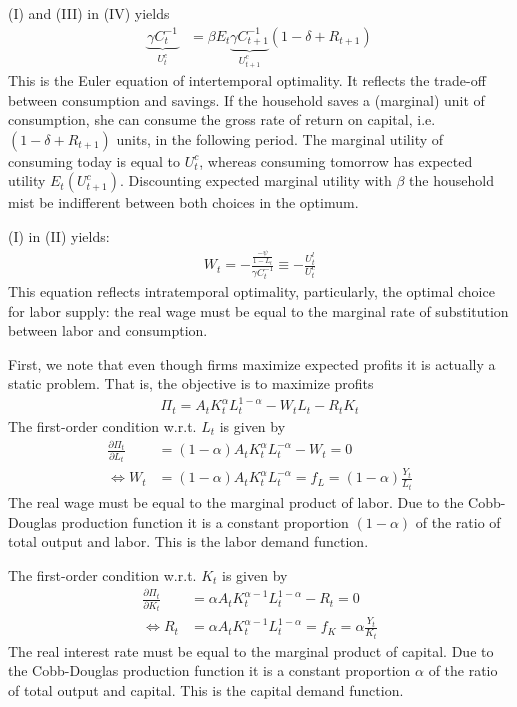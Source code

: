 \begin{Solution}{2}
		(I) and (III) in (IV) yields
		\begin{align*}
		\underbrace{\gamma C_t^{-1}}_{U_t^c} &= \beta E_t \underbrace{\gamma C_{t+1}^{-1}}_{U_{t+1}^c}\left(1-\delta + R_{t+1}\right)
		\end{align*}
		This is the Euler equation of intertemporal optimality. It reflects the trade-off between consumption and savings. If the household saves a (marginal) unit of consumption, she can consume the gross rate of return on capital, i.e. $(1-\delta+R_{t+1})$ units, in the following period. The marginal utility of consuming today is equal to $U_t^c$, whereas consuming tomorrow has expected utility $E_t(U_{t+1}^c)$. Discounting expected marginal utility with $\beta$ the household mist be indifferent between both choices in the optimum.

		(I) in (II) yields:
		\begin{align*}
		W_t = -\frac{\frac{-\psi}{1-L_t}}{\gamma C_t^{-1}} \equiv - \frac{U_t^l}{U_t^c}
		\end{align*}
		This equation reflects intratemporal optimality, particularly, the optimal choice for labor supply: the real wage must be equal to the marginal rate of substitution between labor and consumption.
		
\end{Solution}
\begin{Solution}{3}
		First, we note that even though firms maximize expected profits it is actually a static problem. That is, the objective is to maximize profits
		\begin{align*}
			\Pi_t = A_t K_t^\alpha L_t^{1-\alpha} - W_t L_t - R_t K_t
		\end{align*}
		The first-order condition w.r.t. $L_{t}$ is given by
		\begin{align*}
		\frac{\partial \Pi_t}{\partial L_{t}} &= (1-\alpha) A_t K_t^\alpha L_t^{-\alpha} - W_t = 0\\
		\Leftrightarrow W_t &= (1-\alpha) A_t K_t^\alpha L_t^{-\alpha} = f_L = (1-\alpha) \frac{Y_t}{L_t}
		\end{align*}
		The real wage must be equal to the marginal product of labor. Due to the Cobb-Douglas production function it is a constant proportion $(1-\alpha)$ of the ratio of total output and labor. This is the labor demand function.

		The first-order condition w.r.t. $K_{t}$ is given by
		\begin{align*}
		\frac{\partial \Pi_t}{\partial K_{t}} &= \alpha A_t K_t^{\alpha-1} L_t^{1-\alpha} - R_t = 0\\
		\Leftrightarrow R_t &= \alpha A_t K_t^{\alpha-1} L_t^{1-\alpha} = f_K = \alpha \frac{Y_t}{K_t}
		\end{align*}
		The real interest rate must be equal to the marginal product of capital. Due to the Cobb-Douglas production function it is a constant proportion $\alpha$ of the ratio of total output and capital. This is the capital demand function.
		
\end{Solution}
